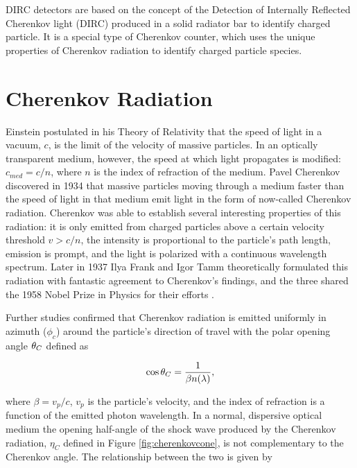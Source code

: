 \label{ch:dirc}
DIRC detectors are based on the concept of the Detection of Internally Reflected Cherenkov light (DIRC) produced in a solid radiator bar to identify charged particle. It is a special type of Cherenkov counter, which uses the unique properties of Cherenkov radiation to identify charged particle species.

\section{Cherenkov Radiation}
Einstein postulated in his Theory of Relativity that the speed of light in a vacuum, $c$, is the limit of the velocity of massive particles. In an optically transparent medium, however, the speed at which light propagates is modified: $c_{med} = c/n$, where $n$ is the index of refraction of the medium. Pavel Cherenkov discovered in 1934 that massive particles moving through a medium faster than the speed of light in that medium emit light in the form of now-called Cherenkov radiation. Cherenkov was able to establish several interesting properties of this radiation: it is only emitted from charged particles above a certain velocity threshold $v > c/n$, the intensity is proportional to the particle's path length, emission is prompt, and the light is polarized with a continuous wavelength spectrum. Later in 1937 Ilya Frank and Igor Tamm theoretically formulated this radiation with fantastic agreement to Cherenkov's findings, and the three shared the 1958 Nobel Prize in Physics for their efforts \cite{CherenkovHistory}.

Further studies confirmed that Cherenkov radiation is emitted uniformly in azimuth ($\phi_c$) around the particle's direction of travel with the polar opening angle $\theta_{C}$ defined as

\begin{equation}
	\cos\theta_{C} = \frac{1}{\beta n(\lambda)},
	\label{eq:cherenkovformula}
\end{equation}

where $\beta = v_p/c$, $v_p$ is the particle's velocity, and the index of refraction is a function of the emitted photon wavelength. In a normal, dispersive optical medium the opening half-angle of the shock wave produced by the Cherenkov radiation, $\eta_C$ defined in Figure \ref{fig:cherenkovcone}, is not complementary to the Cherenkov angle. The relationship between the two is given by

